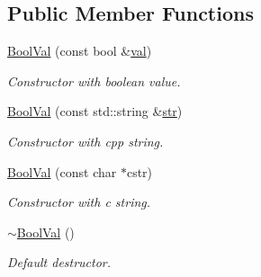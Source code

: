 \subsection*{Public Member Functions}
\begin{DoxyCompactItemize}
\item 
\mbox{\label{classilang_1_1_bool_val_afe7f0116518d5438dd3b450f72ec0645}} 
\mbox{\hyperlink{classilang_1_1_bool_val_afe7f0116518d5438dd3b450f72ec0645}{Bool\+Val}} (const bool \&\mbox{\hyperlink{classilang_1_1_bool_val_a7f6bbc41e3756c774a28f3b43ebc9120}{val}})
\begin{DoxyCompactList}\small\item\em Constructor with boolean value. \end{DoxyCompactList}\item 
\mbox{\label{classilang_1_1_bool_val_a69e29963d40d12b36b21f4f041e36782}} 
\mbox{\hyperlink{classilang_1_1_bool_val_a69e29963d40d12b36b21f4f041e36782}{Bool\+Val}} (const std\+::string \&\mbox{\hyperlink{classilang_1_1_bool_val_a98a6e4a4d7e449a47cb630327cf0b23a}{str}})
\begin{DoxyCompactList}\small\item\em Constructor with cpp string. \end{DoxyCompactList}\item 
\mbox{\label{classilang_1_1_bool_val_a8cbbf2232558caeb903e0b1cf0a0b649}} 
\mbox{\hyperlink{classilang_1_1_bool_val_a8cbbf2232558caeb903e0b1cf0a0b649}{Bool\+Val}} (const char $\ast$cstr)
\begin{DoxyCompactList}\small\item\em Constructor with c string. \end{DoxyCompactList}\item 
\mbox{\label{classilang_1_1_bool_val_a4771c631276d5d94b8408bbaba35db87}} 
\mbox{\hyperlink{classilang_1_1_bool_val_a4771c631276d5d94b8408bbaba35db87}{$\sim$\+Bool\+Val}} ()
\begin{DoxyCompactList}\small\item\em Default destructor. \end{DoxyCompactList}\item 
\mbox{\label{classilang_1_1_bool_val_a98a6e4a4d7e449a47cb630327cf0b23a}} 

\end{DoxyCompactItemize}
